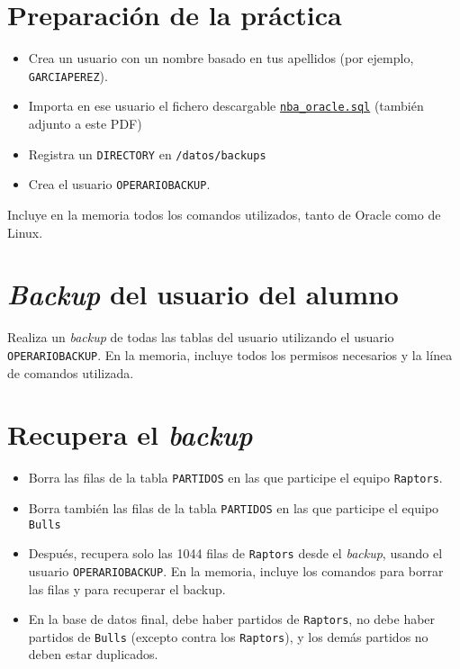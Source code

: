 \documentclass[a4paper]{article}
\begin{document}
\section*{Preparación de la práctica}
\label{sec:org0000003}
\begin{itemize}
\item Crea un usuario con un nombre basado en tus apellidos (por ejemplo, \texttt{GARCIAPEREZ}).
\item Importa en ese usuario el fichero descargable \href{https://alvarogonzalezsotillo.github.io/apuntes-clase/gestion-bd-asir1/ejemplosSQL/nba\_oracle.sql}{\texttt{nba\_oracle.sql}} (también adjunto a este PDF)
\item Registra un \texttt{DIRECTORY} en \texttt{/datos/backups}
\item Crea el usuario \texttt{OPERARIOBACKUP}.
\end{itemize}

Incluye en la memoria todos los comandos utilizados, tanto de Oracle como de Linux.

\section*{\emph{Backup} del usuario del alumno}
\label{sec:org0000006}
Realiza un \emph{backup} de todas las tablas del usuario utilizando el usuario \texttt{OPERARIOBACKUP}. En la memoria, incluye todos los permisos necesarios y la línea de comandos utilizada.

\section*{Recupera el \emph{backup}}
\label{sec:org0000009}
\begin{itemize}
\item Borra las filas de la tabla \texttt{PARTIDOS} en las que participe el equipo \texttt{Raptors}.
\item Borra también las filas de la tabla \texttt{PARTIDOS} en las que participe el equipo \texttt{Bulls}
\item Después, recupera solo las 1044 filas de \texttt{Raptors} desde el \emph{backup}, usando el usuario \texttt{OPERARIOBACKUP}. En la memoria, incluye los comandos para borrar las filas y para recuperar el backup.
\item En la base de datos final, debe haber partidos de \texttt{Raptors}, no debe haber partidos de \texttt{Bulls} (excepto contra los \texttt{Raptors}), y los demás partidos no deben estar duplicados.
\end{itemize}
\end{document}
